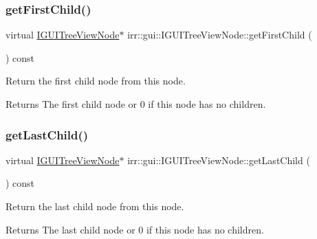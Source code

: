 \subsubsection{\texorpdfstring{get\+First\+Child()}{getFirstChild()}}
{\footnotesize\ttfamily virtual \hyperlink{classirr_1_1gui_1_1IGUITreeViewNode}{I\+G\+U\+I\+Tree\+View\+Node}$\ast$ irr\+::gui\+::\+I\+G\+U\+I\+Tree\+View\+Node\+::get\+First\+Child (\begin{DoxyParamCaption}{ }\end{DoxyParamCaption}) const\hspace{0.3cm}{\ttfamily [pure virtual]}}



Return the first child node from this node. 

\begin{DoxyReturn}{Returns}
The first child node or 0 if this node has no children. 
\end{DoxyReturn}
\mbox{\label{classirr_1_1gui_1_1IGUITreeViewNode_ad9f08dced84c88360485988af188e296}} 
\subsubsection{\texorpdfstring{get\+Last\+Child()}{getLastChild()}}
{\footnotesize\ttfamily virtual \hyperlink{classirr_1_1gui_1_1IGUITreeViewNode}{I\+G\+U\+I\+Tree\+View\+Node}$\ast$ irr\+::gui\+::\+I\+G\+U\+I\+Tree\+View\+Node\+::get\+Last\+Child (\begin{DoxyParamCaption}{ }\end{DoxyParamCaption}) const\hspace{0.3cm}{\ttfamily [pure virtual]}}



Return the last child node from this node. 

\begin{DoxyReturn}{Returns}
The last child node or 0 if this node has no children. 
\end{DoxyReturn}
\mbox{\label{classirr_1_1gui_1_1IGUITreeViewNode_aa57cadea8ba12bb3533ecf2845cd7971}} 
